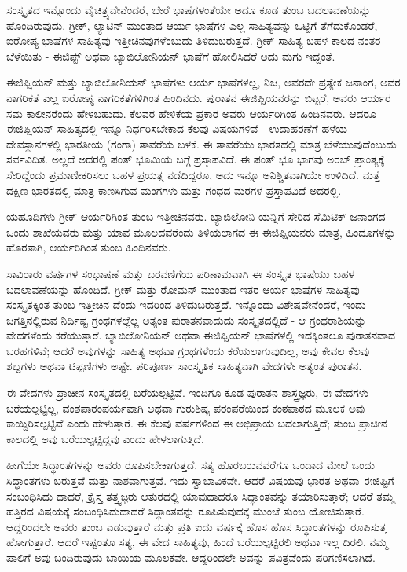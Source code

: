 ಸಂಸ್ಕೃತದ ಇನ್ನೊಂದು ವೈಚಿತ್ರ್ಯವೇನೆಂದರೆ, ಬೇರೆ ಭಾಷೆಗಳಂತೆಯೇ ಅದೂ ಕೂಡ ತುಂಬ ಬದಲಾವಣೆಯನ್ನು ಹೊಂದಿರುವುದು. ಗ್ರೀಕ್, ಲ್ಯಾಟಿನ್ ಮುಂತಾದ ಆರ್ಯ ಭಾಷೆಗಳ ಎಲ್ಲ ಸಾಹಿತ್ಯವನ್ನು ಒಟ್ಟಿಗೆ ತೆಗೆದುಕೊಂಡರೆ, ಐರೋಪ್ಯ ಭಾಷೆಗಳ ಸಾಹಿತ್ಯವು ಇತ್ತೀಚಿನವುಗಳೆಂಬುದು ತಿಳಿದುಬರುತ್ತದೆ. ಗ್ರೀಕ್ ಸಾಹಿತ್ಯ ಬಹಳ ಕಾಲದ ನಂತರ ಬೆಳೆಯಿತು - ಈಜಿಪ್ಟ್ ಅಥವಾ ಬ್ಯಾಬಿಲೋನಿಯನ್ ಭಾಷೆಗೆ ಹೋಲಿಸಿದರೆ ಅದು ಮಗು ಇದ್ದಂತೆ.

ಈಜಿಪ್ಷಿಯನ್ ಮತ್ತು ಬ್ಯಾಬಿಲೋನಿಯನ್ ಭಾಷೆಗಳು ಆರ್ಯ ಭಾಷೆಗಳಲ್ಲ, ನಿಜ, ಅವರದೇ ಪ್ರತ್ಯೇಕ ಜನಾಂಗ, ಅವರ ನಾಗರಿಕತೆ ಎಲ್ಲ ಐರೋಪ್ಯ ನಾಗರಿಕತೆಗಳಿಗಿಂತ ಹಿಂದಿನದು. ಪುರಾತನ ಈಜಿಪ್ಷಿಯನರನ್ನು ಬಿಟ್ಟರೆ, ಅವರು ಆರ್ಯರ ಸಮ ಕಾಲೀನರೆಂದು ಹೇಳಬಹುದು. ಕೆಲವರ ಹೇಳಿಕೆಯ ಪ್ರಕಾರ ಅವರು ಆರ್ಯರಿಗಿಂತ ಹಿಂದಿನವರು. ಆದರೂ ಈಜಿಪ್ಷಿಯನ್ ಸಾಹಿತ್ಯದಲ್ಲಿ ಇನ್ನೂ ನಿರ್ಧರಿಸಬೇಕಾದ ಕೆಲವು ವಿಷಯಗಳಿವೆ - ಉದಾಹರಣೆಗೆ ಹಳೆಯ ದೇವಸ್ಥಾನಗಳಲ್ಲಿ ಭಾರತೀಯ (ಗಂಗಾ) ತಾವರೆಯ ಬಳಕೆ. ಈ ತಾವರೆಯು ಭಾರತದಲ್ಲಿ ಮಾತ್ರ ಬೆಳೆಯುವುದೆಂಬುದು ಸರ್ವವಿದಿತ. ಅಲ್ಲದೆ ಅದರಲ್ಲಿ ಪಂತ್ ಭೂಮಿಯ ಬಗ್ಗೆ ಪ್ರಸ್ತಾಪವಿದೆ. ಈ ಪಂತ್ ಭೂ ಭಾಗವು ಅರಬ್ ಪ್ರಾಂತ್ಯಕ್ಕೆ ಸೇರಿದ್ದೆಂದು ಪ್ರಮಾಣೀಕರಿಸಲು ಬಹಳ ಪ್ರಯತ್ನ ನಡೆದಿದ್ದರೂ, ಅದು ಇನ್ನೂ ಅನಿಶ್ಚಿತವಾಗಿಯೇ ಉಳಿದಿದೆ. ಮತ್ತೆ ದಕ್ಷಿಣ ಭಾರತದಲ್ಲಿ ಮಾತ್ರ ಕಾಣಸಿಗುವ ಮಂಗಗಳು ಮತ್ತು ಗಂಧದ ಮರಗಳ ಪ್ರಸ್ತಾಪವಿದೆ ಅದರಲ್ಲಿ.

ಯಹೂದಿಗಳು ಗ್ರೀಕ್ ಆರ್ಯರಿಗಿಂತ ತುಂಬ ಇತ್ತೀಚಿನವರು. ಬ್ಯಾಬಿಲೋನಿ ಯನ್ನಿಗೆ ಸೇರಿದ ಸೆಮಿಟಿಕ್ ಜನಾಂಗದ ಒಂದು ಶಾಖೆಯವರು ಮತ್ತು ಯಾವ ಮೂಲದವರೆಂದು ತಿಳಿಯಲಾಗದ ಈ ಈಜಿಪ್ಷಿಯನರು ಮಾತ್ರ, ಹಿಂದೂಗಳನ್ನು ಹೊರತಾಗಿ, ಆರ್ಯರಿಗಿಂತ ತುಂಬ ಹಿಂದಿನವರು.

ಸಾವಿರಾರು ವರ್ಷಗಳ ಸಂಭಾಷಣೆ ಮತ್ತು ಬರವಣಿಗೆಯ ಪರಿಣಾಮವಾಗಿ ಈ ಸಂಸ್ಕೃತ ಭಾಷೆಯು ಬಹಳ ಬದಲಾವಣೆಯನ್ನು ಹೊಂದಿದೆ. ಗ್ರೀಕ್ ಮತ್ತು ರೋಮನ್ ಮುಂತಾದ ಇತರ ಆರ್ಯ ಭಾಷೆಗಳ ಸಾಹಿತ್ಯವು ಸಂಸ್ಕೃತಕ್ಕಿಂತ ತುಂಬ ಇತ್ತೀಚಿನ ದೆಂದು ಇದರಿಂದ ತಿಳಿದುಬರುತ್ತದೆ. ಇನ್ನೊಂದು ವಿಶೇಷವೇನೆಂದರೆ, ಇಂದು ಜಗತ್ತಿನಲ್ಲಿರುವ ನಿರ್ದಿಷ್ಟ ಗ್ರಂಥಗಳಲ್ಲೆಲ್ಲ ಅತ್ಯಂತ ಪುರಾತನವಾದುದು ಸಂಸ್ಕೃತದಲ್ಲಿದೆ - ಆ ಗ್ರಂಥರಾಶಿಯನ್ನು ವೇದಗಳೆಂದು ಕರೆಯುತ್ತಾರೆ. ಬ್ಯಾಬಿಲೋನಿಯನ್ ಅಥವಾ ಈಜಿಪ್ಷಿಯನ್ ಭಾಷೆಗಳಲ್ಲಿ ಇದಕ್ಕಿಂತಲೂ ಪುರಾತನವಾದ ಬರಹಗಳಿವೆ; ಆದರೆ ಅವುಗಳನ್ನು ಸಾಹಿತ್ಯ ಅಥವಾ ಗ್ರಂಥಗಳೆಂದು ಕರೆಯಲಾಗುವುದಿಲ್ಲ, ಅವು ಕೇವಲ ಕೆಲವು ಶಬ್ದಗಳು ಅಥವಾ ಟಿಪ್ಪಣಿಗಳು ಅಷ್ಟೇ. ಪರಿಪೂರ್ಣ ಸಾಂಸ್ಕೃತಿಕ ಸಾಹಿತ್ಯವಾಗಿ ವೇದಗಳೇ ಅತ್ಯಂತ ಪುರಾತನ.

ಈ ವೇದಗಳು ಪ್ರಾಚೀನ ಸಂಸ್ಕೃತದಲ್ಲಿ ಬರೆಯಲ್ಪಟ್ಟಿವೆ. ಇಂದಿಗೂ ಕೂಡ ಪುರಾತನ ಶಾಸ್ತ್ರಜ್ಞರು, ಈ ವೇದಗಳು ಬರೆಯಲ್ಪಟ್ಟಿಲ್ಲ, ವಂಶಪಾರಂಪರ್ಯವಾಗಿ ಅಥವಾ ಗುರುಶಿಷ್ಯ ಪರಂಪರೆಯಿಂದ ಕಂಠಪಾಠದ ಮೂಲಕ ಅವು ಕಾಯ್ದಿರಿಸಲ್ಪಟ್ಟಿವೆ ಎಂದು ಹೇಳುತ್ತಾರೆ. ಈ ಕೆಲವು ವರ್ಷಗಳಿಂದ ಈ ಅಭಿಪ್ರಾಯ ಬದಲಾಗುತ್ತಿದೆ; ತುಂಬ ಪ್ರಾಚೀನ ಕಾಲದಲ್ಲಿ ಅವು ಬರೆಯಲ್ಪಟ್ಟಿದ್ದವು ಎಂದು ಹೇಳಲಾಗುತ್ತಿದೆ.

ಹೀಗೆಯೇ ಸಿದ್ಧಾಂತಗಳನ್ನು ಅವರು ರೂಪಿಸಬೇಕಾಗುತ್ತದೆ. ಸತ್ಯ ಹೊರಬರುವವರೆಗೂ ಒಂದಾದ ಮೇಲೆ ಒಂದು ಸಿದ್ಧಾಂತಗಳು ಬರುತ್ತವೆ ಮತ್ತು ನಾಶವಾಗುತ್ತವೆ. ಇದು ಸ್ವಾಭಾವಿಕವೇ. ಆದರೆ ವಿಷಯವು ಭಾರತ ಅಥವಾ ಈಜಿಪ್ಟಿಗೆ ಸಂಬಂಧಿಸಿದು ದಾದರೆ, ಕ್ರೈಸ್ತ ತತ್ತ್ವಜ್ಞರು ಆತುರದಲ್ಲಿ ಯಾವುದಾದರೂ ಸಿದ್ಧಾಂತವನ್ನು ತಯಾರಿಸುತ್ತಾರೆ; ಆದರೆ ತಮ್ಮ ಹತ್ತಿರದ ವಿಷಯಕ್ಕೆ ಸಂಬಂಧಿಸಿದುದಾದರೆ ಸಿದ್ಧಾಂತವನ್ನು ರೂಪಿಸುವುದಕ್ಕೆ ಮುಂಚೆ ತುಂಬ ಯೋಚಿಸುತ್ತಾರೆ. ಆದ್ದರಿಂದಲೇ ಅವರು ತುಂಬ ಎಡುವುತ್ತಾರೆ ಮತ್ತು ಪ್ರತಿ ಐದು ವರ್ಷಕ್ಕೆ ಹೊಸ ಹೊಸ ಸಿದ್ಧಾಂತಗಳನ್ನು ರೂಪಿಸುತ್ತ ಹೋಗುತ್ತಾರೆ. ಆದರೆ ಇಷ್ಟಂತೂ ಸತ್ಯ, ಈ ವೇದ ಸಾಹಿತ್ಯವು, ಹಿಂದೆ ಬರೆಯಲ್ಪಟ್ಟಿರಲಿ ಅಥವಾ ಇಲ್ಲ ದಿರಲಿ, ನಮ್ಮ ಪಾಲಿಗೆ ಅವು ಬಂದಿರುವುದು ಬಾಯಿಯ ಮೂಲಕವೇ. ಆದ್ದರಿಂದಲೇ ಅವನ್ನು ಪವಿತ್ರವೆಂದು ಪರಿಗಣಿಸಲಾಗಿದೆ.

